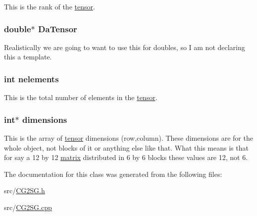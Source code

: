 This is the rank of the \hyperlink{classJKBuilder_1_1tensor}{tensor}. \hypertarget{classJKBuilder_1_1tensor_a91f7b1e58c0e5d1a49ddb8b80ab7790e}{
\subsubsection[{DaTensor}]{\setlength{\rightskip}{0pt plus 5cm}double$\ast$ {\bf DaTensor}}}
\label{classJKBuilder_1_1tensor_a91f7b1e58c0e5d1a49ddb8b80ab7790e}


Realistically we are going to want to use this for doubles, so I am not declaring this a template. \hypertarget{classJKBuilder_1_1tensor_a23ae6a00bed19d2ad34d439636e797da}{
\subsubsection[{nelements}]{\setlength{\rightskip}{0pt plus 5cm}int {\bf nelements}}}
\label{classJKBuilder_1_1tensor_a23ae6a00bed19d2ad34d439636e797da}


This is the total number of elements in the \hyperlink{classJKBuilder_1_1tensor}{tensor}. \hypertarget{classJKBuilder_1_1tensor_a2ce1e6e0782ddee097f2c4aa2663d3e9}{
\subsubsection[{dimensions}]{\setlength{\rightskip}{0pt plus 5cm}int$\ast$ {\bf dimensions}}}
\label{classJKBuilder_1_1tensor_a2ce1e6e0782ddee097f2c4aa2663d3e9}


This is the array of \hyperlink{classJKBuilder_1_1tensor}{tensor} dimensions (row,column). These dimensions are for the whole object, not blocks of it or anything else like that. What this means is that for say a 12 by 12 \hyperlink{classJKBuilder_1_1matrix}{matrix} distributed in 6 by 6 blocks these values are 12, not 6. 

The documentation for this class was generated from the following files:\begin{DoxyCompactItemize}
\item 
src/\hyperlink{CG2SG_8h}{CG2SG.h}\item 
src/\hyperlink{CG2SG_8cpp}{CG2SG.cpp}\end{DoxyCompactItemize}
